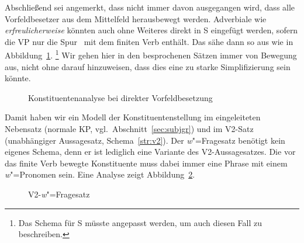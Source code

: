 Abschließend sei angemerkt, dass nicht immer davon ausgegangen wird, dass alle Vorfeldbesetzer aus dem Mittelfeld herausbewegt werden.
Adverbiale wie \textit{erfreulicherweise} \zB könnten auch ohne Weiteres direkt in S eingefügt werden, sofern die VP nur die Spur \Ti\ mit dem finiten Verb enthält.
Das sähe dann so aus wie in Abbildung~\ref{fig:vorfelddirektbesetzung}.%
\footnote{Das Schema für S müsste angepasst werden, um auch diesen Fall zu beschreiben.}
Wir gehen hier in den besprochenen Sätzen immer von Bewegung aus, nicht ohne darauf hinzuweisen, dass dies eine zu starke Simplifizierung sein könnte.

\begin{figure}[!htbp]
  \centering
  \vspace{0.3cm}
  \caption{Konstituentenanalyse bei direkter Vorfeldbesetzung}
  \label{fig:vorfelddirektbesetzung}
\end{figure}

Damit haben wir ein Modell der Konstituentenstellung im eingeleiteten Nebensatz (normale KP, vgl.\ Abschnitt~\ref{sec:subjgr}) und im V2-Satz (unabhängiger Aussagesatz, Schema~\ref{str:v2}).
Der \textit{w}"=Fragesatz benötigt kein eigenes Schema, denn er ist lediglich eine Variante des V2-Aussagesatzes.
Die vor das finite Verb bewegte Konstituente muss dabei immer eine Phrase mit einem \textit{w}"=Pronomen sein.
Eine Analyse zeigt Abbildung~\ref{fig:v2fragesatz}.

\begin{figure}[!htbp]
  \centering
  \vspace{0.3cm}
  \caption{V2-\textit{w}"=Fragesatz}
  \label{fig:v2fragesatz}
\end{figure}


